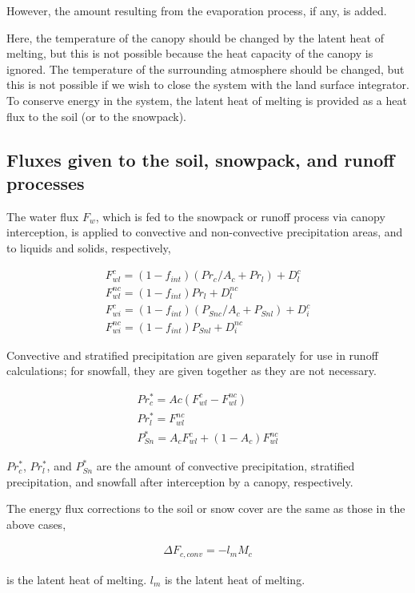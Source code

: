 However, the amount resulting from the evaporation process, if any, is
added.

Here, the temperature of the canopy should be changed by the latent heat
of melting, but this is not possible because the heat capacity of the
canopy is ignored. The temperature of the surrounding atmosphere should
be changed, but this is not possible if we wish to close the system with
the land surface integrator. To conserve energy in the system, the
latent heat of melting is provided as a heat flux to the soil (or to the
snowpack).

\hypertarget{fluxes-given-to-the-soil-snowpack-and-runoff-processes}{%
\subsection{Fluxes given to the soil, snowpack, and runoff
processes}\label{fluxes-given-to-the-soil-snowpack-and-runoff-processes}}

The water flux \(F_w\), which is fed to the snowpack or runoff process
via canopy interception, is applied to convective and non-convective
precipitation areas, and to liquids and solids, respectively,

\begin{eqnarray}
 F_{wl}^{c} = (1-f_{int})( Pr_c / A_c + Pr_l ) + D_{l}^{c} \\
 F_{wl}^{nc} =(1-f_{int}) Pr_l + D_{l}^{nc} \\
 F_{wi}^{c} = (1-f_{int})( P_{Snc} / A_c + P_{Snl} ) + D_{i}^{c} \\
 F_{wi}^{nc} =(1-f_{int}) P_{Snl} + D_{i}^{nc}
\end{eqnarray}

Convective and stratified precipitation are given separately for use in
runoff calculations; for snowfall, they are given together as they are
not necessary.

\begin{eqnarray}
 Pr_c^* = Ac ( F_{wl}^{c} - F_{wl}^{nc} ) \\
 Pr_l^* = F_{wl}^{nc} \\
 P_{Sn}^* = A_c F_{wl}^{c} + (1-A_c) F_{wl}^{nc}
\end{eqnarray}

\(Pr_c^*\), \(Pr_l^*\), and \(P_{Sn}^*\) are the amount of convective
precipitation, stratified precipitation, and snowfall after interception
by a canopy, respectively.

The energy flux corrections to the soil or snow cover are the same as
those in the above cases,

\begin{eqnarray}
 \Delta F_{c,conv} = - l_m M_c
\end{eqnarray}

is the latent heat of melting. \(l_m\) is the latent heat of melting.
